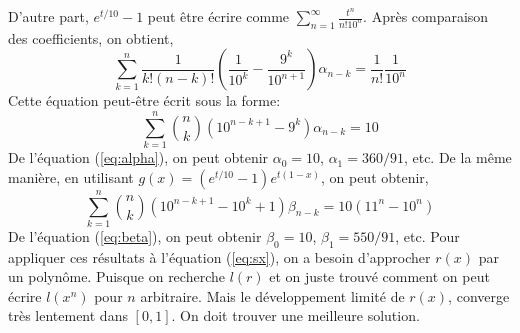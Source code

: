 D'autre part, $e^{t/10}-1$ peut \^{e}tre \'ecrire comme $\sum_{n=1}^{\infty}
\frac{t^{n}}{n!10^{n}}$. Apr\`es comparaison des coefficients, on obtient, \\
\[
	\sum_{k=1}^{n}\frac{1}{k!(n-k)!}\left( \frac{1}{10^{k}} -
	\frac{9^{k}}{10^{n+1}} \right)  \alpha_{n-k} = \frac{1}{n!}\frac{1}{10^{n}} 
\]
Cette \'equation peut-\^etre \'ecrit sous la forme:
\begin{equation}
	\sum_{k=1}^{n} \binom{n}{k}\left(10^{n-k+1}-9^{k}\right) \alpha_{n-k} = 10 
	\label{eq:alpha}
\end{equation}
De l'\'equation (\ref{eq:alpha}), on peut obtenir $\alpha_{0} = 10$,
$\alpha_{1} = 360/91$, etc. De la m\^{e}me mani\`ere, en utilisant $g(x)
= (e^{t/10} - 1)e^{t(1-x)}$, on peut obtenir,
\begin{equation}
	\sum_{k=1}^{n} \binom{n}{k}\left(10^{n-k+1}-10^{k}+1\right) \beta_{n-k} =
	10(11^{n}-10^{n}) 
	\label{eq:beta}
\end{equation}
De l'\'equation (\ref{eq:beta}), on peut obtenir $\beta_{0} = 10$, $\beta_{1}
= 550/91$, etc. Pour appliquer ces r\'esultats \`a l'\'equation (\ref{eq:sx}),
on a besoin d'approcher $r(x)$ par un polyn\^{o}me. Puisque on recherche $l(r)$
et on juste trouv\'e comment on peut \'ecrire $l(x^{n})$ pour $n$ arbitraire.
Mais le d\'eveloppement limit\'e de $r(x)$, converge tr\`es lentement dans
$[0,1]$. On doit trouver une meilleure solution.

